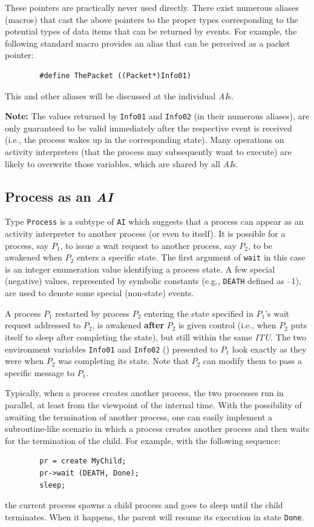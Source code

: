 These pointers are practically never used directly.
There exist numerous aliases (macros) that cast the above pointers to the
proper types corresponding to the potential types of
data items that can be returned by events.
For example, the following standard macro provides an alias
that can be perceived as a packet pointer:
\begin{verbatim}
        #define ThePacket ((Packet*)Info01)
\end{verbatim}
This and other aliases will be discussed at the individual {\em AI\/}s.

\noindent
{\bf Note:}
The values returned by {\tt Info01} and {\tt Info02} (in their numerous
aliases), are only guaranteed to be valid immediately after the
respective event is received (i.e., the process wakes up in the
corresponding state).
Many operations on activity interpreters (that the process may subsequently
want to execute) are likely to overwrite those variables, which are
shared by all {\em AI\/}s.

\subsection{Process as an {\em AI}}
\label{rm_pr_pa}

Type {\tt Process} is a subtype of {\tt AI} which suggests that a process
can appear as an activity interpreter to another process (or even to itself).
It is possible for a process, say $P_1$, to issue a wait request to
another process, say $P_2$, to be awakened when $P_2$ enters a
specific state.
The first argument of {\tt wait} in this case is an integer enumeration
value identifying a process state.
A few special (negative) values, represented by symbolic constants
(e.g., {\tt DEATH} defined as --1), are used to denote some
special (non-state) events.

A process $P_1$ restarted by process $P_2$ entering the state specified in
$P_1$'s wait request addressed to $P_2$, is awakened {\bf after} $P_2$ is
given control (i.e., when $P_2$ puts itself to sleep after completing the
state), but still within the same {\em ITU}.
The two environment variables {\tt Info01} and {\tt Info02} ()
presented to
$P_1$ look exactly as they were when $P_2$ was completing its state.
Note that $P_2$ can modify them to pass a specific message to $P_1$.

Typically, when a process creates another process, the two processes run
in parallel, at least from the viewpoint of the internal time.
With the possibility of awaiting the termination of another process, one
can easily implement a subroutine-like
scenario in which a process creates another process
and then waits for the termination of the child.
For example, with the following sequence:
\begin{verbatim}
        pr = create MyChild;
        pr->wait (DEATH, Done);
        sleep;
\end{verbatim}
the current process spawns a child process and goes to sleep until the
child terminates.
When it happens,
the parent will resume its execution in state {\tt Done}.

